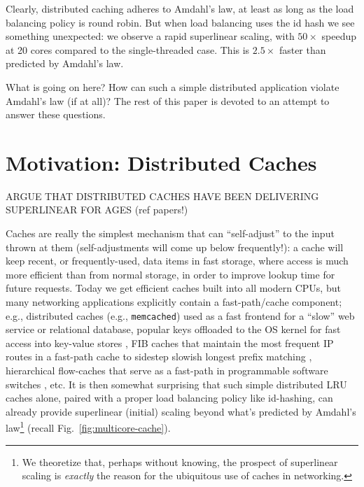 \documentclass[letterpaper,twocolumn,10pt]{article}
\begin{document}
Clearly, distributed caching adheres to Amdahl's law, at least as long as the load balancing policy is round robin. But when load balancing uses the id hash we see something unexpected: we observe a rapid superlinear scaling, with $50\times$ speedup at 20 cores compared to the single-threaded case. This is $2.5\times$ faster than predicted by Amdahl's law.

What is going on here? How can such a simple distributed application violate Amdahl's law (if at all)? The rest of this paper is devoted to an attempt to answer these questions. %


\section{Motivation: Distributed Caches}
\label{sec:motivation}

ARGUE THAT DISTRIBUTED CACHES HAVE BEEN DELIVERING SUPERLINEAR FOR AGES (ref papers!)

Caches are really the simplest mechanism that can ``self-adjust'' to the input thrown at them (self-adjustments will come up below frequently!): a cache will keep recent, or frequently-used, data items in fast storage, where access is much more efficient than from normal storage, in order to improve lookup time for future requests. Today we get efficient caches built into all modern CPUs, but many networking applications explicitly contain a fast-path\slash cache component; e.g., distributed caches (e.g., \texttt{memcached}) used as a fast frontend for a ``slow'' web service or relational database, popular keys offloaded to the OS kernel for fast access into key-value stores \cite{179747, ghigoff2021bmc}, FIB caches that maintain the most frequent IP routes in a fast-path cache to sidestep slowish longest prefix matching \cite{rottenstreich2016optimal}, hierarchical flow-caches that serve as a fast-path in programmable software switches \cite{188960}, etc. It is then somewhat surprising that such simple distributed LRU caches alone, paired with a proper load balancing policy like id-hashing, can already provide superlinear (initial) scaling beyond what's predicted by Amdahl's law\footnote{We theoretize that, perhaps without knowing, the prospect of superlinear scaling is \emph{exactly} the reason for the ubiquitous use of caches in networking.} (recall Fig.~\ref{fig:multicore-cache}).
\end{document}
